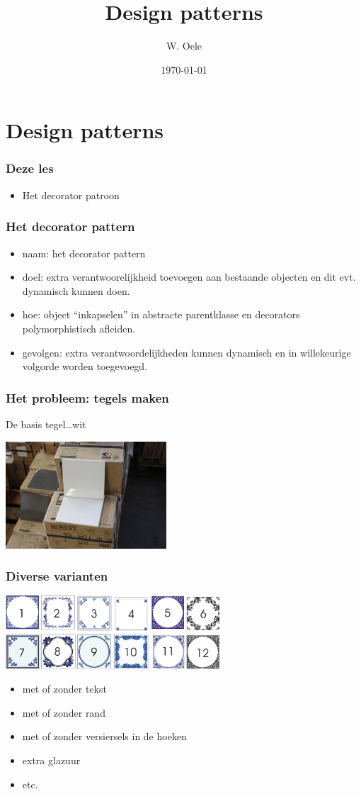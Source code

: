 \documentclass{beamer}
\title{Design patterns}
\author{W. Oele}
\date{\today}
\begin{document}
\frame{\titlepage}

\section{Design patterns}

\begin{frame}
\frametitle{Deze les}
\begin{itemize}
\item Het decorator patroon
\end{itemize}
\end{frame}


\begin{frame}
\frametitle{Het decorator pattern}
\begin{itemize}
\item naam: het decorator pattern
\item doel: extra verantwoorelijkheid toevoegen aan bestaande objecten en dit evt. dynamisch kunnen doen.
\item hoe: object ``inkapselen'' in abstracte parentklasse en decorators polymorphistisch afleiden.
\item gevolgen: extra verantwoordelijkheden kunnen dynamisch en in willekeurige volgorde worden toegevoegd.
\end{itemize}
\end{frame}

\begin{frame}
\frametitle{Het probleem: tegels maken}
De basis tegel\ldots wit
\begin{center}
\includegraphics[width=6cm]{tegel1}
\end{center}
\end{frame}

\begin{frame}
\frametitle{Diverse varianten}
\begin{center}
\includegraphics[width=8cm]{tegel2}
\begin{itemize}
\item met of zonder tekst
\item met of zonder rand
\item met of zonder versiersels in de hoeken
\item extra glazuur
\item etc.
\end{itemize}
\end{center}
\end{frame}
\end{document}
